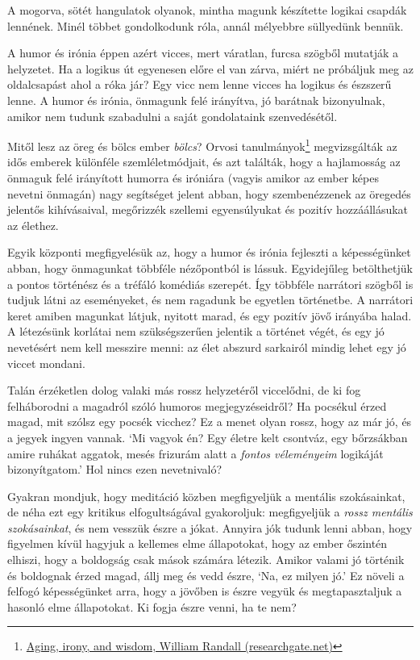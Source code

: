 \noindent A mogorva, sötét hangulatok olyanok, mintha magunk készítette
logikai csapdák lennének. Minél többet gondolkodunk róla, annál
mélyebbre süllyedünk bennük.

A humor és irónia éppen azért vicces, mert váratlan, furcsa szögből
mutatják a helyzetet. Ha a logikus út egyenesen előre el van zárva,
miért ne próbáljuk meg az oldalcsapást ahol a róka jár? Egy vicc nem
lenne vicces ha logikus és észszerű lenne. A humor és irónia, önmagunk
felé irányítva, jó barátnak bizonyulnak, amikor nem tudunk szabadulni a
saját gondolataink szenvedésétől.

Mitől lesz az öreg és bölcs ember \emph{bölcs}? Orvosi
tanulmányok\footnote{\href{https://www.researchgate.net/publication/258190619_Aging_irony_and_wisdom_On_the_narrative_psychology_of_later_life}{Aging,
  irony, and wisdom, William Randall (researchgate.net)}} megvizsgálták
az idős emberek különféle szemléletmódjait, és azt találták, hogy a
hajlamosság az önmaguk felé irányított humorra és iróniára (vagyis
amikor az ember képes nevetni önmagán) nagy segítséget jelent abban,
hogy szembenézzenek az öregedés jelentős kihívásaival, megőrizzék
szellemi egyensúlyukat és pozitív hozzáállásukat az élethez.

Egyik központi megfigyelésük az, hogy a humor és irónia fejleszti a
képességünket abban, hogy önmagunkat többféle nézőpontból is lássuk.
Egyidejűleg betölthetjük a pontos történész és a tréfáló komédiás
szerepét. Így többféle narrátori szögből is tudjuk látni az eseményeket,
és nem ragadunk be egyetlen történetbe. A narrátori keret amiben
magunkat látjuk, nyitott marad, és egy pozitív jövő irányába halad. A
létezésünk korlátai nem szükségszerűen jelentik a történet végét, és egy
jó nevetésért nem kell messzire menni: az élet abszurd sarkairól mindig
lehet egy jó viccet mondani.

Talán érzéketlen dolog valaki más rossz helyzetéről viccelődni, de ki
fog felháborodni a magadról szóló humoros megjegyzéseidről? Ha pocsékul
érzed magad, mit szólsz egy pocsék vicchez? Ez a menet olyan rossz, hogy
az már jó, és a jegyek ingyen vannak. `Mi vagyok én? Egy életre kelt
csontváz, egy bőrzsákban amire ruhákat aggatok, mesés frizurám alatt a
\emph{fontos véleményeim} logikáját bizonyítgatom.' Hol nincs ezen
nevetnivaló?

Gyakran mondjuk, hogy meditáció közben megfigyeljük a mentális
szokásainkat, de néha ezt egy kritikus elfogultságával gyakoroljuk:
megfigyeljük a \emph{rossz mentális szokásainkat}, és nem vesszük észre
a jókat. Annyira jók tudunk lenni abban, hogy figyelmen kívül hagyjuk a
kellemes elme állapotokat, hogy az ember őszintén elhiszi, hogy a
boldogság csak mások számára létezik. Amikor valami jó történik és
boldognak érzed magad, állj meg és vedd észre, `Na, ez milyen jó.' Ez
növeli a felfogó képességünket arra, hogy a jövőben is észre vegyük és
megtapasztaljuk a hasonló elme állapotokat. Ki fogja észre venni, ha te
nem?

